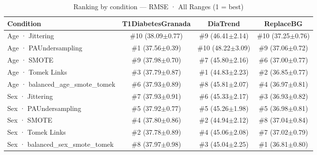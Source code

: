 \begin{table}[htbp]
\centering
\small
\caption{Ranking by condition — RMSE · All Ranges  (1 = best)}
\label{tab:ranking_rmse_entire_family_mechanism_guided}
\begin{tabular}{lccc}
\toprule
\textbf{Condition} & \textbf{T1DiabetesGranada} & \textbf{DiaTrend} & \textbf{ReplaceBG} \\
\midrule
Age · Jittering & \#10 (38.09$\pm$0.77) & \#9 (46.41$\pm$2.14) & \#10 (37.25$\pm$0.76) \\
Age · PAUndersampling & \#1 (37.56$\pm$0.39) & \#10 (48.22$\pm$3.09) & \#9 (37.06$\pm$0.72) \\
Age · SMOTE & \#9 (37.98$\pm$0.70) & \#7 (45.80$\pm$2.16) & \#6 (37.00$\pm$0.77) \\
Age · Tomek Links & \#3 (37.79$\pm$0.87) & \#1 (44.83$\pm$2.23) & \#2 (36.85$\pm$0.77) \\
Age · balanced_age_smote_tomek & \#6 (37.93$\pm$0.89) & \#8 (45.81$\pm$2.07) & \#4 (36.97$\pm$0.81) \\
\midrule
Sex · Jittering & \#7 (37.93$\pm$0.91) & \#6 (45.33$\pm$2.17) & \#3 (36.93$\pm$0.82) \\
Sex · PAUndersampling & \#5 (37.92$\pm$0.77) & \#5 (45.26$\pm$1.98) & \#5 (36.98$\pm$0.81) \\
Sex · SMOTE & \#4 (37.80$\pm$0.86) & \#2 (44.94$\pm$2.12) & \#8 (37.04$\pm$0.84) \\
Sex · Tomek Links & \#2 (37.78$\pm$0.89) & \#4 (45.06$\pm$2.08) & \#7 (37.02$\pm$0.79) \\
Sex · balanced_sex_smote_tomek & \#8 (37.97$\pm$0.98) & \#3 (45.04$\pm$2.25) & \#1 (36.81$\pm$0.80) \\
\bottomrule
\end{tabular}
\end{table}